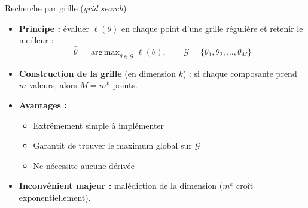 \documentclass[11pt,aspectratio=169]{beamer}
\DeclareMathOperator*{\argmax}{arg\,max}
\begin{document}
\begin{frame}{Recherche par grille (\textit{grid search})}

\begin{itemize}

\item \textbf{Principe :} évaluer $\ell(\theta)$ en chaque point d'une grille régulière et retenir le meilleur :
  \[
  \boxed{\hat{\theta} = \argmax_{\theta \in \mathcal{G}} \ell(\theta), \qquad \mathcal{G} = \{\theta_1, \theta_2, \ldots, \theta_M\}}
  \]

\item \textbf{Construction de la grille} (en dimension $k$) : si chaque composante prend $m$ valeurs, alors $M = m^k$ points.\newline

\item \textbf{Avantages :}
  \begin{itemize}
    \item Extrêmement simple à implémenter\newline
    \item Garantit de trouver le maximum global sur $\mathcal{G}$\newline
    \item Ne nécessite aucune dérivée\newline
  \end{itemize}

\item \textbf{Inconvénient majeur :} malédiction de la dimension ($m^k$ croît exponentiellement).

\end{itemize}

\end{frame}
\end{document}
